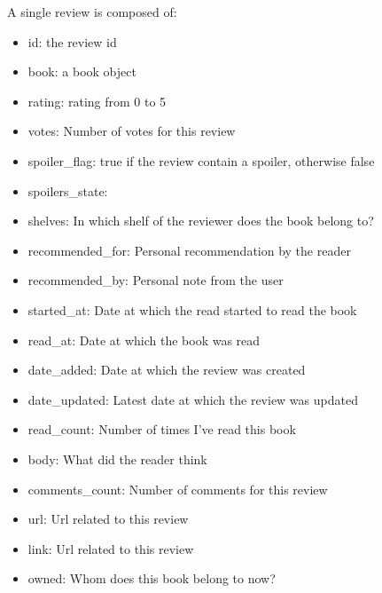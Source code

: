 A single review is composed of:
\begin{itemize}
\item id: the review id
\item book: a book object
\item rating: rating from 0 to 5
\item votes: Number of votes for this review
\item spoiler_flag: true if the review contain a spoiler, otherwise false
\item spoilers_state: 
\item shelves: In which shelf of the reviewer does the book belong to?
\item recommended_for: Personal recommendation by the reader
\item recommended_by: Personal note from the user
\item started_at:  Date at which the read started to read the book
\item read_at:  Date at which the book was read
\item date_added: Date at which the review was created
\item date_updated: Latest date at which the review was updated
\item read_count: Number of times I've read this book
\item body: What did the reader think
\item comments_count: Number of comments for this review
\item url: Url related to this review
\item link: Url related to this review
\item owned: Whom does this book belong to now?
\end{itemize}


